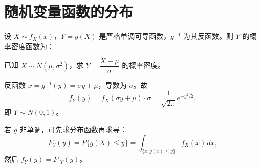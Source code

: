 \section{随机变量函数的分布}

\begin{theorem}
设 $X \sim f_X(x)$，$Y = g(X)$ 是严格单调可导函数，$g^{-1}$ 为其反函数。则 $Y$ 的概率密度函数为：
\begin{myformula}
\end{myformula}
\end{theorem}

\begin{example}[线性变换]
已知 $X \sim N(\mu, \sigma^2)$，求 $Y = \dfrac{X - \mu}{\sigma}$ 的概率密度。

\begin{solution}
反函数 $x = g^{-1}(y) = \sigma y + \mu$，导数为 $\sigma$。故
\[f_Y(y) = f_X(\sigma y + \mu) \cdot \sigma = \frac{1}{\sqrt{2\pi}} e^{-y^2/2},\]
即 $Y \sim N(0, 1)$。
\end{solution}
\end{example}

\begin{remark}[非单调变换的处理]
若 $g$ 非单调，可先求分布函数再求导：
\[F_Y(y) = P\{g(X) \leq y\} = \int_{\{x: g(x) \leq y\}} f_X(x)\,dx,\]
然后 $f_Y(y) = F'_Y(y)$。
\end{remark}
